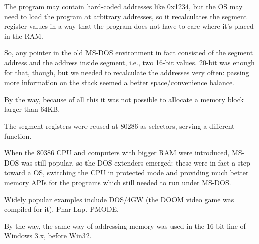 The program may contain hard-coded addresses like 0x1234, but the \ac{OS} may need to load the program at arbitrary
addresses, so it recalculates the segment register values in a way that the program does not have to care 
where it's placed in the RAM.

So, any pointer in the old MS-DOS environment in fact consisted of the segment address and the address inside
segment, i.e., two 16-bit values. 20-bit was enough for that, though, but we needed to recalculate
the addresses very often: passing more information on the stack seemed a better space/convenience balance.

By the way, because of all this it was not possible to allocate a memory block larger than 64KB.


The segment registers were reused at 80286 as selectors, serving a different function.


When the 80386 CPU and computers with bigger \ac{RAM} were introduced,
MS-DOS was still popular, so the DOS extenders emerged: these were in fact
a step toward a  \ac{OS},
switching the CPU in protected mode and providing much better memory \ac{API}s for the programs 
which still needed to run under MS-DOS.

Widely popular examples include DOS/4GW (the DOOM video game was compiled for it), Phar Lap, PMODE.
\par
{}

By the way, the same way of addressing memory was used in the 16-bit line of Windows 3.x, before Win32.

